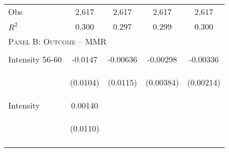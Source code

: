 \begin{subtables}
\begin{table}[htpb!]
\begin{center}
\begin{tabular}{p{5cm}cccc}
Obs	&	2,617	&	2,617	&	2,617	&	2,617	\\  
$R^2$	&	0.300	&	0.297	&	0.299	&	0.300	\\ \midrule
\multicolumn{5}{l}{\textsc{Panel B: Outcome – MMR}}									\\  
\vspace{4pt}	&	\begin{footnotesize}\end{footnotesize}	&	\begin{footnotesize}\end{footnotesize}	&	\begin{footnotesize}\end{footnotesize}	&	\begin{footnotesize}\end{footnotesize}	 \\
Intensity 56-60	&	-0.0147	&	-0.00636	&	-0.00298	&	-0.00336	 \\
	& \begin{footnotesize}	(0.0104)	\end{footnotesize} & \begin{footnotesize}	(0.0115)	\end{footnotesize} & \begin{footnotesize}	(0.00384)	\end{footnotesize} & \begin{footnotesize}	(0.00214)	\end{footnotesize} \\
Intensity  	&	0.00140	&		&		&		 \\
	& \begin{footnotesize}	(0.0110)	\end{footnotesize} & \begin{footnotesize}		\end{footnotesize} & \begin{footnotesize}		\end{footnotesize} & \begin{footnotesize}		\end{footnotesize} \\
\vspace{4pt}	&	\begin{footnotesize}\end{footnotesize}	&	\begin{footnotesize}\end{footnotesize}	&	\begin{footnotesize}\end{footnotesize}	&	\begin{footnotesize}\end{footnotesize}	 \\

\end{tabular}
\end{center}
\end{table}
\end{subtables}
